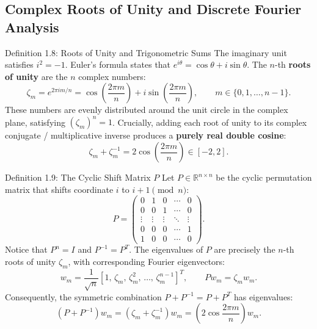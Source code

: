 \documentclass[11pt]{article}
\begin{document}
\subsection{Complex Roots of Unity and Discrete Fourier Analysis}

\begin{defbox}{Definition 1.8: Roots of Unity and Trigonometric Sums}
The imaginary unit satisfies $i^2 = -1$. Euler's formula states that $e^{i\theta} = \cos\theta + i\sin\theta$.
The $n$-th \textbf{roots of unity} are the $n$ complex numbers:
\begin{equation}
  \zeta_m = e^{2\pi i m / n} = \cos\left(\frac{2\pi m}{n}\right) + i \sin\left(\frac{2\pi m}{n}\right), \qquad m \in \{0, 1, \dots, n-1\}.
\end{equation}
These numbers are evenly distributed around the unit circle in the complex plane, satisfying $(\zeta_m)^n = 1$.
Crucially, adding each root of unity to its complex conjugate / multiplicative inverse produces a \textbf{purely real double cosine}:
\begin{equation}
  \zeta_m + \zeta_m^{-1} = 2\cos\left(\frac{2\pi m}{n}\right) \in [-2, 2].
\end{equation}
\end{defbox}

\begin{defbox}{Definition 1.9: The Cyclic Shift Matrix $P$}
Let $P \in \mathbb{R}^{n \times n}$ be the cyclic permutation matrix that shifts coordinate $i$ to $i+1 \pmod n$:
\begin{equation}
  P = \begin{pmatrix}
    0 & 1 & 0 & \cdots & 0 \\
    0 & 0 & 1 & \cdots & 0 \\
    \vdots & \vdots & \vdots & \ddots & \vdots \\
    0 & 0 & 0 & \cdots & 1 \\
    1 & 0 & 0 & \cdots & 0
  \end{pmatrix}.
\end{equation}
Notice that $P^n = I$ and $P^{-1} = P^T$. The eigenvalues of $P$ are precisely the $n$-th roots of unity $\zeta_m$, with corresponding Fourier eigenvectors:
\begin{equation}
  w_m = \frac{1}{\sqrt{n}} \left[ 1, \, \zeta_m, \, \zeta_m^2, \, \dots, \, \zeta_m^{n-1} \right]^T, \qquad P w_m = \zeta_m w_m.
\end{equation}
Consequently, the symmetric combination $P + P^{-1} = P + P^T$ has eigenvalues:
\begin{equation}
  (P + P^{-1}) w_m = (\zeta_m + \zeta_m^{-1}) w_m = \left(2\cos\frac{2\pi m}{n}\right) w_m.
\end{equation}
\end{defbox}
\end{document}

